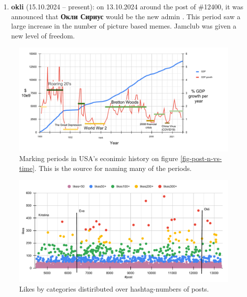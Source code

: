 \documentclass[
	12pt
] {article}
\begin{document}
\begin{enumerate}
		\item \textbf{okli} (15.10.2024 -- present): on 13.10.2024 around the post of \#12400, it was announced that \textbf{Окли Сириус} would be the new admin \cite{vk-announcement-of-okli}. This period saw a large increase in the number of picture based memes. Jamclub was given a new level of freedom.
	\end{enumerate}
	
	\begin{figure}[H]
		\centering
		\includegraphics[width=1\textwidth]{fig-post-n-vs-time-joke}
		\caption{Marking periods in USA's econimic history on figure \ref{fig-post-n-vs-time}. This is the source for naming many of the periods.}
		\label{fig-post-n-vs-time-joke}
	\end{figure}
	
	
	\begin{figure}[H]
		\centering
		\includegraphics[width=1\textwidth]{fig-likes-mega-likes-vs-post-n}
		\caption{Likes by categories distiributed over hashtag-numbers of posts.}
		\label{fig-likes-mega-likes-vs-post-n}
	\end{figure}
	
\end{document}

